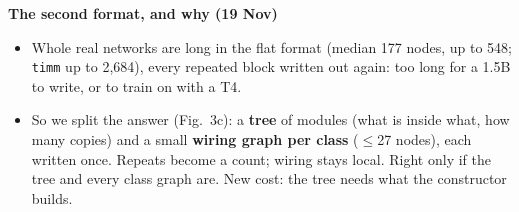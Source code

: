 \documentclass[
  t,%
]{_style/tudelft-beamerposter}
\begin{document}
\begin{frame}
  \begin{minipage}[t]{0.36\linewidth}
    \vspace{0pt}
    \textbf{The second format, and why (19 Nov)}
    \begin{itemize}
      \item Whole real networks are long in the flat format (median 177 nodes, up to 548; \texttt{timm} up to
      2{,}684), every repeated block written out again: too long for a 1.5B to write, or to train on with a T4.
      \item So we split the answer (Fig.~3c): a \textbf{tree} of modules (what is inside what, how many copies)
      and a small \textbf{wiring graph per class} ($\le$27 nodes), each written once. Repeats become a count;
      wiring stays local. Right only if the tree and every class graph are. New cost: the tree needs what the constructor
      builds.
    \end{itemize}
  \end{minipage}


\end{frame}
\end{document}
